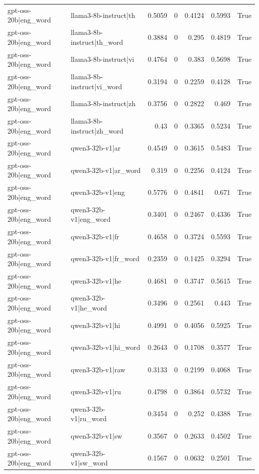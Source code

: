 \begin{table}
\begin{tabular}{l l r r r r l}
gpt-oss-20b|eng_word & llama3-8b-instruct|th & 0.5059 & 0 & 0.4124 & 0.5993 & True \\
gpt-oss-20b|eng_word & llama3-8b-instruct|th_word & 0.3884 & 0 & 0.295 & 0.4819 & True \\
gpt-oss-20b|eng_word & llama3-8b-instruct|vi & 0.4764 & 0 & 0.383 & 0.5698 & True \\
gpt-oss-20b|eng_word & llama3-8b-instruct|vi_word & 0.3194 & 0 & 0.2259 & 0.4128 & True \\
gpt-oss-20b|eng_word & llama3-8b-instruct|zh & 0.3756 & 0 & 0.2822 & 0.469 & True \\
gpt-oss-20b|eng_word & llama3-8b-instruct|zh_word & 0.43 & 0 & 0.3365 & 0.5234 & True \\
gpt-oss-20b|eng_word & qwen3-32b-v1|ar & 0.4549 & 0 & 0.3615 & 0.5483 & True \\
gpt-oss-20b|eng_word & qwen3-32b-v1|ar_word & 0.319 & 0 & 0.2256 & 0.4124 & True \\
gpt-oss-20b|eng_word & qwen3-32b-v1|eng & 0.5776 & 0 & 0.4841 & 0.671 & True \\
gpt-oss-20b|eng_word & qwen3-32b-v1|eng_word & 0.3401 & 0 & 0.2467 & 0.4336 & True \\
gpt-oss-20b|eng_word & qwen3-32b-v1|fr & 0.4658 & 0 & 0.3724 & 0.5593 & True \\
gpt-oss-20b|eng_word & qwen3-32b-v1|fr_word & 0.2359 & 0 & 0.1425 & 0.3294 & True \\
gpt-oss-20b|eng_word & qwen3-32b-v1|he & 0.4681 & 0 & 0.3747 & 0.5615 & True \\
gpt-oss-20b|eng_word & qwen3-32b-v1|he_word & 0.3496 & 0 & 0.2561 & 0.443 & True \\
gpt-oss-20b|eng_word & qwen3-32b-v1|hi & 0.4991 & 0 & 0.4056 & 0.5925 & True \\
gpt-oss-20b|eng_word & qwen3-32b-v1|hi_word & 0.2643 & 0 & 0.1708 & 0.3577 & True \\
gpt-oss-20b|eng_word & qwen3-32b-v1|raw & 0.3133 & 0 & 0.2199 & 0.4068 & True \\
gpt-oss-20b|eng_word & qwen3-32b-v1|ru & 0.4798 & 0 & 0.3864 & 0.5732 & True \\
gpt-oss-20b|eng_word & qwen3-32b-v1|ru_word & 0.3454 & 0 & 0.252 & 0.4388 & True \\
gpt-oss-20b|eng_word & qwen3-32b-v1|sw & 0.3567 & 0 & 0.2633 & 0.4502 & True \\
gpt-oss-20b|eng_word & qwen3-32b-v1|sw_word & 0.1567 & 0 & 0.0632 & 0.2501 & True \\

\end{tabular}
\end{table}
